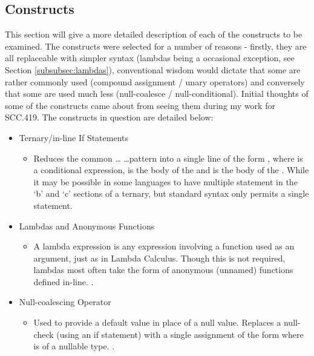 \documentclass{article}
\begin{document}
    \subsection{Constructs}
        \label{subsec:constructs}
        This section will give a more detailed description of each of the constructs to be examined. The constructs were selected for a number of reasons - firstly, they are all replaceable with simpler syntax (lambdas being a occasional exception, see Section \ref{subsubsec:lambdas}), conventional wisdom would dictate that some are rather commonly used (compound assignment / unary operators) and conversely that some are used much less (null-coalesce / null-conditional). Initial thoughts of some of the constructs came about from seeing them during my work for SCC.419. The constructs in question are detailed below:
        \begin{itemize}
            \item Ternary/in-line If Statements
                \begin{itemize}
                    \item Reduces the common  \dots {} \dots pattern into a single line of the form , where  is a conditional expression,  is the body of the  and  is the body of the . While it may be possible in some languages to have multiple statement in the `b' and `c' sections of a ternary, but standard syntax only permits a single statement.
                \end{itemize}
            \item Lambdas and Anonymous Functions
                \begin{itemize}
                    \item A lambda expression is any expression involving a function used as an argument, just as in Lambda Calculus. Though this is not required, lambdas most often take the form of anonymous (unnamed) functions defined in-line. \citep{javaLambdas}.
                \end{itemize}
            \item Null-coalescing Operator
                \begin{itemize}
                    \item Used to provide a default value in place of a null value. Replaces a null-check (using an if statement) with a single assignment of the form \newline{} where  is of a nullable type. \citep{cs5Spec}.

\end{itemize}
\end{itemize}
\end{document}
